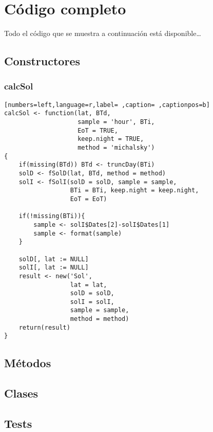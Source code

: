 \chapter{Código completo}

Todo el código que se muestra a continuación está disponible\ldots{}

\section{Constructores}
\label{sec:orgc18b513}
\subsection{calcSol}
\label{sec:org6f41b19}
\begin{lstlisting}[numbers=left,language=r,label= ,caption= ,captionpos=b]
calcSol <- function(lat, BTd,
                    sample = 'hour', BTi,
                    EoT = TRUE,
                    keep.night = TRUE,
                    method = 'michalsky')
{
    if(missing(BTd)) BTd <- truncDay(BTi)
    solD <- fSolD(lat, BTd, method = method)
    solI <- fSolI(solD = solD, sample = sample,
                  BTi = BTi, keep.night = keep.night,
                  EoT = EoT)

    if(!missing(BTi)){
        sample <- solI$Dates[2]-solI$Dates[1]
        sample <- format(sample)
    }

    solD[, lat := NULL]
    solI[, lat := NULL]
    result <- new('Sol',
                  lat = lat,
                  solD = solD,
                  solI = solI,
                  sample = sample,
                  method = method)
    return(result)
}
\end{lstlisting}

\section{Métodos}
\label{sec:orged25485}
\section{Clases}
\label{sec:orgb65e119}
\section{Tests}
\label{sec:org1af2e80}
